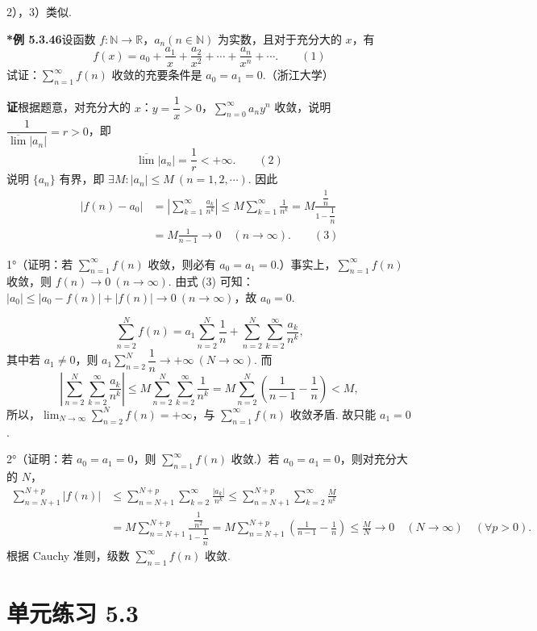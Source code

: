\documentclass[UTF8,12pt,a4paper,fontset=fandol]{ctexart}
\begin{document}
2），3）类似.

\noindent\textbf{*例 5.3.46}\quad 设函数 $f:\mathbb N\to\mathbb R$，$a_n(n\in\mathbb N)$ 为实数，且对于充分大的 $x$，有
\[
  f(x)=a_0+\frac{a_1}{x}+\frac{a_2}{x^2}+\cdots+\frac{a_n}{x^n}+\cdots. \qquad(1)
\]
试证：$\displaystyle\sum_{n=1}^{\infty}f(n)$ 收敛的充要条件是 $a_0=a_1=0$.（浙江大学）

\noindent\textbf{证}\quad 根据题意，对充分大的 $x$：$y=\dfrac1x>0$，$\displaystyle\sum_{n=0}^{\infty}a_ny^n$ 收敛，说明 $\dfrac1{\overline{\lim}|a_n|}=r>0$，即
\[
  \overline{\lim}|a_n|=\frac1r<+\infty. \qquad(2)
\]
说明 $\{a_n\}$ 有界，即 $\exists M:|a_n|\le M\ (n=1,2,\cdots)$. 因此
\[
\begin{aligned}
|f(n)-a_0|
&=\left|\sum_{k=1}^{\infty}\frac{a_k}{n^k}\right|
\le M\sum_{k=1}^{\infty}\frac1{n^k}
=M\frac{\dfrac1n}{1-\dfrac1n}\\
&=M\frac1{n-1}\to0\quad(n\to\infty). \qquad(3)
\end{aligned}
\]

1°（证明：若 $\displaystyle\sum_{n=1}^{\infty}f(n)$ 收敛，则必有 $a_0=a_1=0$.）事实上，$\displaystyle\sum_{n=1}^{\infty}f(n)$ 收敛，则 $f(n)\to0\ (n\to\infty)$. 由式 (3) 可知：$|a_0|\le |a_0-f(n)|+|f(n)|\to0\ (n\to\infty)$，故 $a_0=0$.

\[
  \sum_{n=2}^N f(n)=a_1\sum_{n=2}^N\frac1n
  +\sum_{n=2}^N\sum_{k=2}^{\infty}\frac{a_k}{n^k},
\]
其中若 $a_1\ne0$，则 $a_1\displaystyle\sum_{n=2}^N\dfrac1n\to+\infty\ (N\to\infty)$. 而
\[
  \left|\sum_{n=2}^N\sum_{k=2}^{\infty}\frac{a_k}{n^k}\right|
  \le M\sum_{n=2}^N\sum_{k=2}^{\infty}\frac1{n^k}
  =M\sum_{n=2}^N\left(\frac1{n-1}-\frac1n\right)<M,
\]
所以，$\displaystyle\lim_{N\to\infty}\sum_{n=2}^N f(n)=+\infty$，与 $\displaystyle\sum_{n=1}^{\infty}f(n)$ 收敛矛盾. 故只能 $a_1=0$.

2°（证明：若 $a_0=a_1=0$，则 $\displaystyle\sum_{n=1}^{\infty}f(n)$ 收敛.）若 $a_0=a_1=0$，则对充分大的 $N$，
\[
\begin{aligned}
\sum_{n=N+1}^{N+p}|f(n)|
&\le\sum_{n=N+1}^{N+p}\sum_{k=2}^{\infty}\frac{|a_k|}{n^k}
\le\sum_{n=N+1}^{N+p}\sum_{k=2}^{\infty}\frac{M}{n^k}\\
&=M\sum_{n=N+1}^{N+p}\frac{\dfrac1{n^2}}{1-\dfrac1n}
=M\sum_{n=N+1}^{N+p}\left(\frac1{n-1}-\frac1n\right)
\le\frac MN\to0\quad(N\to\infty)\quad(\forall p>0).
\end{aligned}
\]
根据 Cauchy 准则，级数 $\displaystyle\sum_{n=1}^{\infty}f(n)$ 收敛.

\section*{单元练习 5.3}
\end{document}

